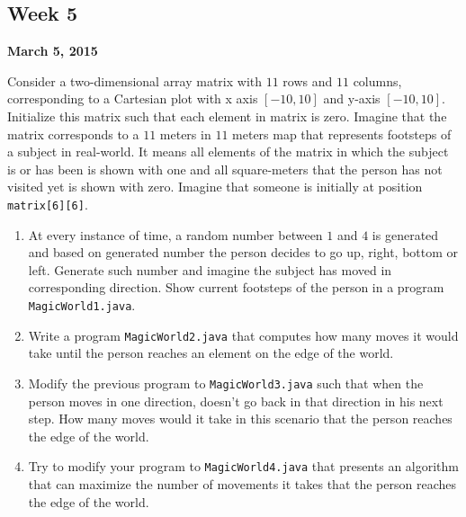 \documentclass[12pt,letterpaper,twoside]{article}
\begin{document}


\subsection*{Week 5}
\hfill \textbf{March 5, 2015}

Consider a two-dimensional array matrix with $11$ rows and $11$ columns, corresponding to a Cartesian plot with x axis $[-10, 10]$ and y-axis $[-10, 10]$. Initialize this matrix such that each element in matrix is zero. Imagine that the matrix corresponds to a $11$ meters in $11$ meters map that represents footsteps of a subject in real-world. It means all elements of the matrix in which the subject is or has been is shown with one and all square-meters that the person has not visited yet is shown with zero. Imagine that someone is initially at position \texttt{matrix[6][6]}.
\begin{enumerate}[itemsep=0pt]
\item At every instance of time, a random number between $1$ and $4$ is generated and based on generated number the person decides to go up, right, bottom or left. Generate such number and imagine the subject has moved in corresponding direction. Show current footsteps of the person in a program \texttt{MagicWorld1.java}.
\item Write a program \texttt{MagicWorld2.java} that computes how many moves it would take until the person reaches an element on the edge of the world.
\item Modify the previous program to \texttt{MagicWorld3.java} such that when the person moves in one direction, doesn't go back in that direction in his next step. How many moves would it take in this scenario that the person reaches the edge of the world.
\item Try to modify your program to \texttt{MagicWorld4.java} that presents an algorithm that can maximize the number of movements it takes that the person reaches the edge of the world.
\end{enumerate}
\end{document}
